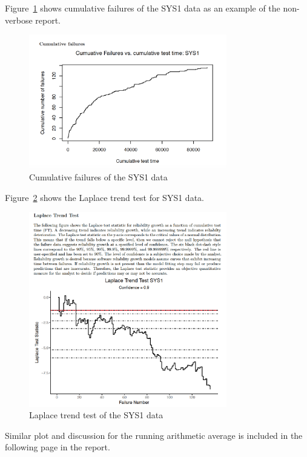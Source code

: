 \documentclass[conference]{IEEEtran}
\begin{document}
Figure~\ref{fig:SYS1NonVerbose} shows cumulative failures of the SYS1 data as an example of the non-verbose report.
\begin{figure}[!ht]
\centering
\includegraphics[width=3.4in]{Figures/SYS1NonVerbose}
\caption{Cumulative failures of the SYS1 data}
\label{fig:SYS1NonVerbose}
\end{figure}


Figure~\ref{fig:SYS1LTT} shows the Laplace trend test for SYS1 data.
\begin{figure}[!ht]
\centering
\includegraphics[width=3.4in]{Figures/SYS1LTT}
\caption{Laplace trend test of the SYS1 data}
\label{fig:SYS1LTT}
\end{figure}

\noindent Similar plot and discussion for the running arithmetic average is included in the following page in the report.
\end{document}
